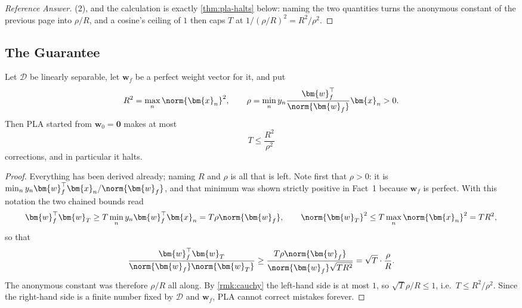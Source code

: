 \begin{proof}[Reference Answer]
    (2), and the calculation is exactly \autoref{thm:pla-halts} below: naming
    the two quantities turns the anonymous constant of the previous page into
    \(\rho/R\), and a cosine's ceiling of \(1\) then caps \(T\) at
    \(1/(\rho/R)^2 = R^2/\rho^2\).
\end{proof}

\subsection{The Guarantee}

\begin{theorem}\label{thm:pla-halts}
    Let \(\mathcal{D}\) be linearly separable, let \(\bm{w}_f\) be a perfect
    weight vector for it, and put
    \[
        R^2 = \max_n \norm{\bm{x}_n}^2, \qquad
        \rho = \min_n y_n \frac{\bm{w}_f^\top}{\norm{\bm{w}_f}} \bm{x}_n > 0 .
    \]
    Then PLA started from \(\bm{w}_0 = \bm{0}\) makes at most
    \[
        T \le \frac{R^2}{\rho^2}
    \]
    corrections, and in particular it halts.
\end{theorem}

\begin{proof}
    Everything has been derived already; naming \(R\) and \(\rho\) is all that
    is left. Note first that \(\rho > 0\): it is \(\min_n y_n
    \bm{w}_f^\top \bm{x}_n / \norm{\bm{w}_f}\), and that minimum was shown
    strictly positive in Fact~1 because \(\bm{w}_f\) is perfect. With this
    notation the two chained bounds read
    \[
        \bm{w}_f^\top \bm{w}_T \ge T \min_n y_n \bm{w}_f^\top \bm{x}_n
        = T \rho \norm{\bm{w}_f} ,
        \qquad
        \norm{\bm{w}_T}^2 \le T \max_n \norm{\bm{x}_n}^2 = T R^2 ,
    \]
    so that
    \[
        \frac{\bm{w}_f^\top \bm{w}_T}{\norm{\bm{w}_f} \norm{\bm{w}_T}}
        \ge \frac{T \rho \norm{\bm{w}_f}}{\norm{\bm{w}_f} \sqrt{T R^2}}
        = \sqrt{T} \cdot \frac{\rho}{R} .
    \]
    The anonymous constant was therefore \(\rho/R\) all along. By
    \autoref{rmk:cauchy} the left-hand side is at most \(1\), so
    \(\sqrt{T} \rho / R \le 1\), i.e.\ \(T \le R^2 / \rho^2\). Since the
    right-hand side is a finite number fixed by \(\mathcal{D}\) and
    \(\bm{w}_f\), PLA cannot correct mistakes forever.
\end{proof}

